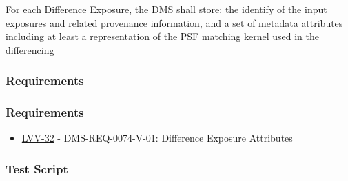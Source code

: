 For each Difference Exposure, the DMS shall store: the identify of the
input exposures and related provenance information, and a set of
metadata attributes including at least a representation of the PSF
matching kernel used in the differencing

\hypertarget{requirements-32}{%
\subsubsection{Requirements}\label{requirements-32}}

\hypertarget{requirements-33}{%
\subsubsection{Requirements}\label{requirements-33}}

\begin{itemize}
\tightlist
\item
  \href{https://jira.lsstcorp.org/browse/LVV-32}{LVV-32} -
  DMS-REQ-0074-V-01: Difference Exposure Attributes
\end{itemize}

\hypertarget{test-script-16}{%
\subsubsection{Test Script}\label{test-script-16}}

